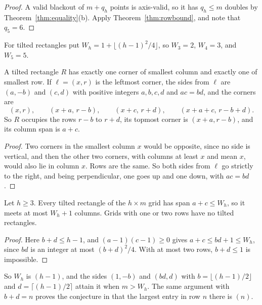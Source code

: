 \begin{proof}
A valid blackout of $m+q_h$ points is axis-valid, so it has $q_h\le m$ doubles by Theorem~\ref{thm:equality}(b). Apply Theorem~\ref{thm:rowbound}, and note that $q_5=6$.
\end{proof}

For tilted rectangles put $W_h=1+\lfloor(h-1)^2/4\rfloor$, so $W_3=2$, $W_4=3$, and $W_5=5$.

\begin{lemma}\label{lem:leftmost}
A tilted rectangle $R$ has exactly one corner of smallest column and exactly one of smallest row. If $\ell=(x,r)$ is the leftmost corner, the sides from $\ell$ are $(a,-b)$ and $(c,d)$ with positive integers $a,b,c,d$ and $ac=bd$, and the corners are
\begin{equation}\label{eq:tilt-param}
(x,r),\qquad(x+a,\,r-b),\qquad(x+c,\,r+d),\qquad(x+a+c,\,r-b+d).
\end{equation}
So $R$ occupies the rows $r-b$ to $r+d$, its topmost corner is $(x+a,r-b)$, and its column span is $a+c$.
\end{lemma}

\begin{proof}
Two corners in the smallest column $x$ would be opposite, since no side is vertical, and then the other two corners, with columns at least $x$ and mean $x$, would also lie in column $x$. Rows are the same. So both sides from $\ell$ go strictly to the right, and being perpendicular, one goes up and one down, with $ac=bd$.
\end{proof}

\begin{lemma}\label{lem:span}
Let $h\ge3$. Every tilted rectangle of the $h\times m$ grid has span $a+c\le W_h$, so it meets at most $W_h+1$ columns. Grids with one or two rows have no tilted rectangles.
\end{lemma}

\begin{proof}
Here $b+d\le h-1$, and $(a-1)(c-1)\ge0$ gives $a+c\le bd+1\le W_h$, since $bd$ is an integer at most $(b+d)^2/4$. With at most two rows, $b+d\le1$ is impossible.
\end{proof}

So $W_h$ is $(h-1)$, and the sides $(1,-b)$ and $(bd,d)$ with $b=\lfloor(h-1)/2\rfloor$ and $d=\lceil(h-1)/2\rceil$ attain it when $m>W_h$. The same argument with $b+d=n$ proves the conjecture in  that the largest entry in row $n$ there is $(n)$.

